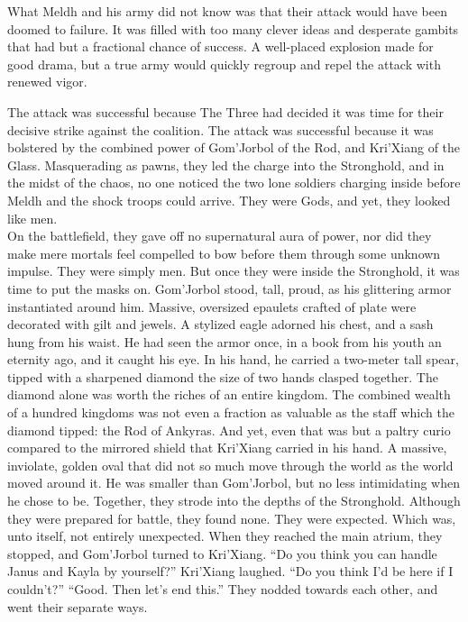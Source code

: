 What Meldh and his army did not know was that their attack would have been doomed to failure. It was filled with too many clever ideas and desperate gambits that had but a fractional chance of success. A well-placed explosion made for good drama, but a true army would quickly regroup and repel the attack with renewed vigor.

The attack was successful because The Three had decided it was time for their decisive strike against the coalition. The attack was successful because it was bolstered by the combined power of Gom’Jorbol of the Rod, and Kri’Xiang of the Glass. Masquerading as pawns, they led the charge into the Stronghold, and in the midst of the chaos, no one noticed the two lone soldiers charging inside before Meldh and the shock troops could arrive.
\SmallVSpace
They were Gods, and yet, they looked like men.\\On the battlefield, they gave off no supernatural aura of power, nor did they make mere mortals feel compelled to bow before them through some unknown impulse. They were simply men. But once they were inside the Stronghold, it was time to put the masks on.
\SomeVSpace
Gom’Jorbol stood, tall, proud, as his glittering armor instantiated around him. Massive, oversized epaulets crafted of plate were decorated with gilt and jewels. A stylized eagle adorned his chest, and a sash hung from his waist. He had seen the armor once, in a book from his youth an eternity ago, and it caught his eye. In his hand, he carried a two-meter tall spear, tipped with a sharpened diamond the size of two hands clasped together. The diamond alone was worth the riches of an entire kingdom. The combined wealth of a hundred kingdoms was not even a fraction as valuable as the staff which the diamond tipped: the Rod of Ankyras.
\SmallVSpace
And yet, even that was but a paltry curio compared to the mirrored shield that Kri’Xiang carried in his hand. A massive, inviolate, golden oval that did not so much move through the world as the world moved around it. He was smaller than Gom’Jorbol, but no less intimidating when he chose to be. Together, they strode into the depths of the Stronghold.
\SmallVSpace
Although they were prepared for battle, they found none. They were expected. Which was, unto itself, not entirely unexpected. When they reached the main atrium, they stopped, and Gom’Jorbol turned to Kri’Xiang.
\SmallVSpace
“Do you think you can handle Janus and Kayla by yourself?”
\SmallVSpace
Kri’Xiang laughed. “Do you think I’d be here if I couldn’t?”
\SmallVSpace
“Good. Then let’s end this.”
\SmallVSpace
They nodded towards each other, and went their separate ways.

